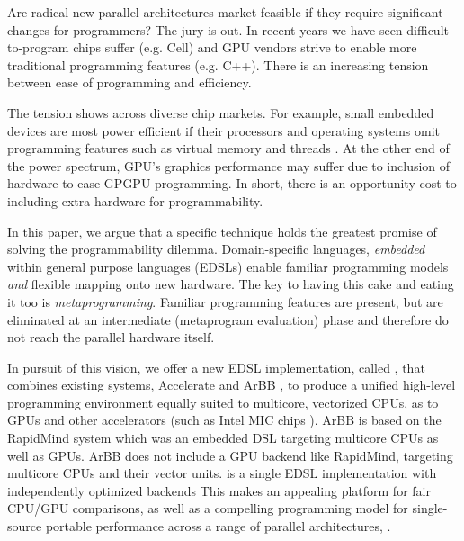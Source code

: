 Are radical new parallel architectures market-feasible if they require
significant changes for programmers?  The jury is out.  In recent
years we have seen difficult-to-program chips suffer 
(e.g. Cell)
and
GPU vendors strive to enable more traditional programming features
 (e.g. C++).  There is an increasing
tension between ease of programming and efficiency.

The tension  shows  across diverse chip markets.  For example,
small embedded devices are most power efficient if their processors and operating systems
omit programming features such as virtual memory and threads .  
At the other end of the power spectrum, GPU's
graphics performance may suffer due to inclusion of hardware to ease
GPGPU programming.  In short, there is an opportunity cost to
including extra hardware for programmability.

In this paper, we argue 
that a specific technique holds the greatest promise of solving the programmability dilemma.
%
Domain-specific languages, {\em embedded} within general purpose
languages (EDSLs) 
 enable familiar programming models 
{\em and} flexible
mapping onto new hardware.  The key to having this cake and eating it
too is {\em metaprogramming}.  Familiar programming features are
present, but are eliminated at an intermediate (metaprogram evaluation)
phase and therefore do not reach the parallel hardware itself.


In pursuit of this vision, we offer a
% 
 new EDSL implementation, called \accarbb{}, that combines
existing systems, Accelerate  and ArBB , to produce a unified
high-level programming environment equally suited to multicore,
vectorized CPUs, as to GPUs and other accelerators (such as Intel MIC chips ).
%
ArBB is based on the RapidMind  system which was an embedded 
DSL targeting multicore CPUs as well as GPUs. ArBB does not  include a GPU 
backend like RapidMind, targeting multicore CPUs and their vector 
units. 
\fi{}
\systemname{} is a single EDSL implementation 
with independently optimized backends 
This makes
\systemname{} an appealing platform for fair CPU/GPU comparisons, 
as well as a compelling programming model for single-source portable performance across a range of
parallel architectures, .


